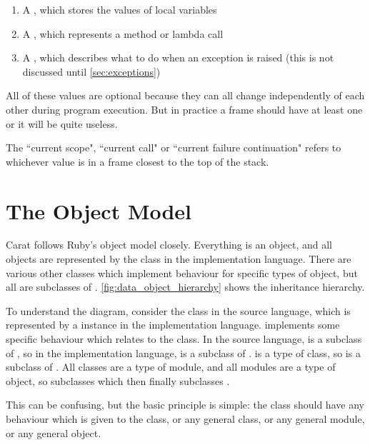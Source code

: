 \begin{enumerate}
  \item A , which stores the values of local variables
  \item A , which represents a method or lambda call
  \item A , which describes what to do when an exception is raised (this is not discussed until \autoref{sec:exceptions})
\end{enumerate}

All of these values are optional because they can all change independently of each other during program execution. But in practice a frame should have at least one or it will be quite useless.

The ``current scope", ``current call" or ``current failure continuation" refers to whichever value is in a frame closest to the top of the stack.

\section{The Object Model}
\label{sec:object_model}

Carat follows Ruby's object model closely. Everything is an object, and all objects are represented by the class  in the implementation language. There are various other classes which implement behaviour for specific types of object, but all are subclasses of . \autoref{fig:data_object_hierarchy} shows the inheritance hierarchy.

To understand the diagram, consider the class  in the source language, which is represented by a  instance in the implementation language.  implements some specific behaviour which relates to the  class. In the source language,  is a subclass of , so in the implementation language,  is a subclass of .  is a type of class, so  is a subclass of . All classes are a type of module, and all modules are a type of object, so  subclasses  which then finally subclasses .

This can be confusing, but the basic principle is simple: the  class should have any behaviour which is given to the  class, or any general class, or any general module, or any general object.

